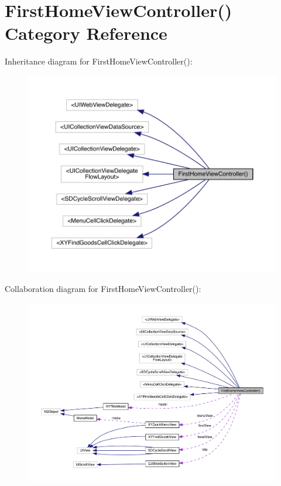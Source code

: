 \hypertarget{category_first_home_view_controller_07_08}{}\section{First\+Home\+View\+Controller() Category Reference}
\label{category_first_home_view_controller_07_08}


Inheritance diagram for First\+Home\+View\+Controller()\+:\nopagebreak
\begin{figure}[H]
\begin{center}
\leavevmode
\includegraphics[width=350pt]{category_first_home_view_controller_07_08__inherit__graph}
\end{center}
\end{figure}


Collaboration diagram for First\+Home\+View\+Controller()\+:\nopagebreak
\begin{figure}[H]
\begin{center}
\leavevmode
\includegraphics[width=350pt]{category_first_home_view_controller_07_08__coll__graph}
\end{center}
\end{figure}
